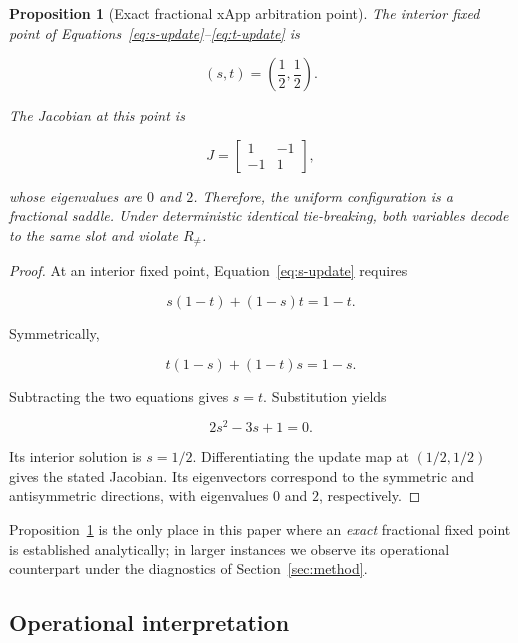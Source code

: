 \documentclass[pdflatex,sn-mathphys-num,iicol,oneside]{sn-jnl}
\newtheorem{proposition}{Proposition}
\begin{document}
\begin{proposition}[Exact fractional xApp arbitration point]
\label{prop:motif}
The interior fixed point of
Equations~\eqref{eq:s-update}--\eqref{eq:t-update} is

\begin{equation}
(s,t)=\left(\frac{1}{2},\frac{1}{2}\right).
\end{equation}

The Jacobian at this point is

\begin{equation}
J=
\begin{bmatrix}
1 & -1\\
-1 & 1
\end{bmatrix},
\end{equation}

whose eigenvalues are $0$ and $2$. Therefore, the uniform
configuration is a fractional saddle. Under deterministic identical
tie-breaking, both variables decode to the same slot and violate
$R_{\neq}$.
\end{proposition}

\begin{proof}
At an interior fixed point,
Equation~\eqref{eq:s-update} requires

\begin{equation}
s(1-t)+(1-s)t=1-t.
\end{equation}

Symmetrically,

\begin{equation}
t(1-s)+(1-t)s=1-s.
\end{equation}

Subtracting the two equations gives $s=t$. Substitution yields

\begin{equation}
2s^2-3s+1=0.
\end{equation}

Its interior solution is $s=1/2$. Differentiating the update map at
$(1/2,1/2)$ gives the stated Jacobian. Its eigenvectors correspond to
the symmetric and antisymmetric directions, with eigenvalues $0$ and
$2$, respectively.
\end{proof}

Proposition~\ref{prop:motif} is the only place in this paper where an
\emph{exact} fractional fixed point is established analytically; in
larger instances we observe its operational counterpart under the
diagnostics of Section~\ref{sec:method}.

\subsection{Operational interpretation}
\end{document}
